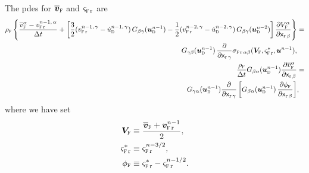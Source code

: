 The \acp{pde} for $\bvbarf$ and $\sigmafr{}$ are
\bw
\begin{align}
    \label{eq_fl_rigid_fl_1_reference_disc_aux}
    \rhof \left\{  \frac{\vbarf^\alpha - \vfr{n-1,\, \alpha}}{\deltat} + \left[ \frac{3}{2} ( \vfr{n-1,\, \gamma}  -  \udomdot^{n-1,\, \gamma}) \, G_{\beta \gamma}(\budom^{n-1})  - \frac{1}{2} ( \vfr{n-2,\, \gamma}  -  \udomdot^{n-2,\, \gamma}) \, G_{\beta \gamma}(\budom^{n-2})  \right] \frac{\partial  \Vf^\alpha}{\partial \xr[\beta]}\right\} & =              \newlinenn
    G_{\gamma \beta}(\budom^{n-1})  \,          \pderr{}{\gamma} \sigmastressr{\alpha}{\beta}(\bVf, \sigmafr{\ast}, \bu^{n-1}),
    \\
    \label{eq_poiss_like_phi}
    \frac{\rhof}{\deltat} G_{\beta \alpha}(\budom^{n-1}) \pderr{\vbarf^\alpha }{\beta}                                                                                                                                                                                                                                                                   & = \newlinenn
    G_{\gamma \alpha}(\budom^{n-1}) \pderr{}{\gamma}\left[ G_{\beta \alpha}(\budom^{n-1})  \,          \pderr{ \phif   }{\beta } \right]                                                                                                                                                                                                                 & ,
\end{align}
\ew
where we have set
\begin{align}
    \label{eq_def_Vf}
    \bVf           & \equiv\frac{ \bvbarf + \bvfr{n-1}}{2},     \\
    \label{eq_def_sigmarast}
    \sigmafr{\ast} & \equiv \sigmafr{\nmthalf},                 \\
    \label{eq_def_phi_pressure}
    \phif          & \equiv \sigmafr{\ast} - \sigmafr{\nmhalf}.
\end{align}


